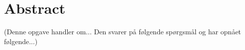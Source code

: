 \documentclass[Main]{subfiles}
\begin{document}
\section{Abstract}

(Denne opgave handler om... Den svarer på følgende spørgsmål og har opnået følgende...)
\end{document}
